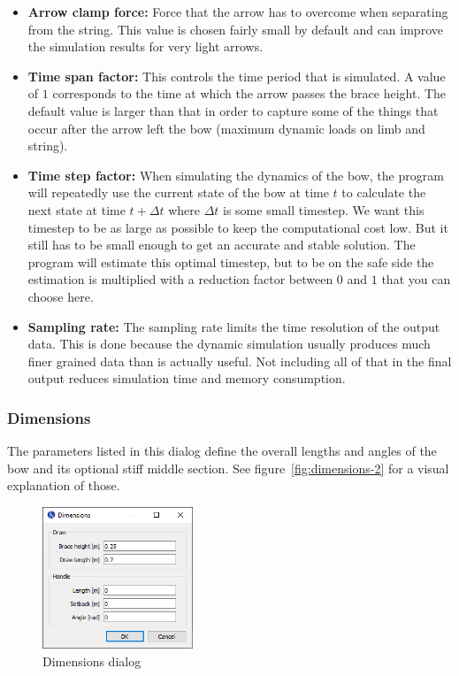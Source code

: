 \documentclass[12pt]{article}
\begin{document}
\begin{itemize}
\item \textbf{Arrow clamp force:} Force that the arrow has to overcome when separating from the string.
This value is chosen fairly small by default and can improve the simulation results for very light arrows.
\item \textbf{Time span factor:} This controls the time period that is simulated. A value of $1$ corresponds to the time at which the arrow passes the brace height. The default value is larger than that in order to capture some of the things that occur after the arrow left the bow (maximum dynamic loads on limb and string).
\item \textbf{Time step factor:} When simulating the dynamics of the bow, the program will repeatedly use the current state of the bow at time $t$ to calculate the next state at time $t + \Delta t$ where $\Delta t$ is some small timestep. We want this timestep to be as large as possible to keep the computational cost low. But it still has to be small enough to get an accurate and stable solution. The program will estimate this optimal timestep, but to be on the safe side the estimation is multiplied with a reduction factor between $0$ and $1$ that you can choose here.
\item \textbf{Sampling rate:} The sampling rate limits the time resolution of the output data. This is done because the dynamic simulation usually produces much finer grained data than is actually useful. Not including all of that in the final output reduces simulation time and memory consumption.
\end{itemize}

\newpage
\subsubsection{Dimensions}
\label{sec:dimensions}

The parameters listed in this dialog define the overall lengths and angles of the bow and its optional stiff middle section. See figure~\ref{fig:dimensions-2} for a visual explanation of those.
\bigskip

\begin{figure}[H]
\centering
\includegraphics[width=0.4\textwidth]{figures/screenshots/input/dimensions}
\caption{Dimensions dialog}
\label{fig:dimensions-1}
\end{figure}
\end{document}
